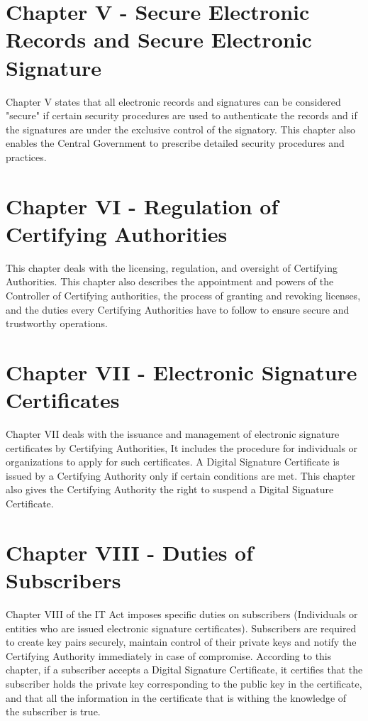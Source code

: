 \documentclass{extreport}
\begin{document}
\section*{Chapter V - Secure Electronic Records and Secure Electronic Signature} 

\par Chapter V states that all electronic records and signatures can be considered "secure" if certain security procedures are used to authenticate the records and if the signatures are under the exclusive control of the signatory. This chapter also enables the Central Government to prescribe detailed security procedures and practices. 

\section*{Chapter VI - Regulation of Certifying Authorities}

\par This chapter deals with the licensing, regulation, and oversight of Certifying Authorities. This chapter also describes the appointment and powers of the Controller of Certifying authorities, the process of granting and revoking licenses, and the duties every Certifying Authorities have to follow to ensure secure and trustworthy operations. 

\section*{Chapter VII - Electronic Signature Certificates}

\par Chapter VII deals with the issuance and management of electronic signature certificates by Certifying Authorities, It includes the procedure for individuals or organizations to apply for such certificates. A Digital Signature Certificate is issued by a Certifying Authority only if certain conditions are met. This chapter also gives the Certifying Authority the right to suspend a Digital Signature Certificate. 

\section*{Chapter VIII - Duties of Subscribers}

\par Chapter VIII of the IT Act imposes specific duties on subscribers (Individuals or entities who are issued electronic signature certificates). Subscribers are required to create key pairs securely, maintain control of their private keys and notify the Certifying Authority immediately in case of compromise. According to this chapter, if a subscriber accepts a Digital Signature Certificate, it certifies that the subscriber holds the private key corresponding to the public key in the certificate, and that all the information in the certificate that is withing the knowledge of the subscriber is true.
\end{document}
